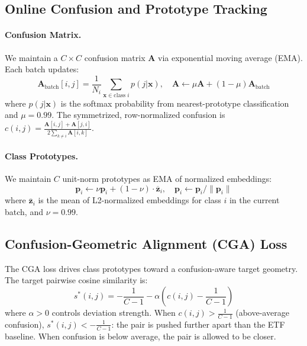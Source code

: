 \documentclass{article}
\begin{document}
\subsection{Online Confusion and Prototype Tracking}

\paragraph{Confusion Matrix.} We maintain a $C \times C$ confusion matrix $\mathbf{A}$ via exponential moving average (EMA). Each batch updates:
\begin{equation}
\mathbf{A}_{\text{batch}}[i,j] = \frac{1}{N_i} \sum_{\mathbf{x} \in \text{class } i} p(j|\mathbf{x}), \quad
\mathbf{A} \leftarrow \mu \mathbf{A} + (1-\mu) \mathbf{A}_{\text{batch}}
\end{equation}
where $p(j|\mathbf{x})$ is the softmax probability from nearest-prototype classification and $\mu = 0.99$. The symmetrized, row-normalized confusion is $c(i,j) = \frac{\mathbf{A}[i,j] + \mathbf{A}[j,i]}{2 \sum_{k \neq i} \mathbf{A}[i,k]}$.

\paragraph{Class Prototypes.} We maintain $C$ unit-norm prototypes as EMA of normalized embeddings:
\begin{equation}
\mathbf{p}_i \leftarrow \nu \mathbf{p}_i + (1-\nu) \cdot \overline{\mathbf{z}}_i, \quad \mathbf{p}_i \leftarrow \mathbf{p}_i / \|\mathbf{p}_i\|
\end{equation}
where $\overline{\mathbf{z}}_i$ is the mean of L2-normalized embeddings for class $i$ in the current batch, and $\nu = 0.99$.

\subsection{Confusion-Geometric Alignment (CGA) Loss}

The CGA loss drives class prototypes toward a confusion-aware target geometry. The target pairwise cosine similarity is:
\begin{equation}
s^*(i,j) = -\frac{1}{C-1} - \alpha \left(c(i,j) - \frac{1}{C-1}\right)
\label{eq:target}
\end{equation}
where $\alpha > 0$ controls deviation strength. When $c(i,j) > \frac{1}{C-1}$ (above-average confusion), $s^*(i,j) < -\frac{1}{C-1}$: the pair is pushed further apart than the ETF baseline. When confusion is below average, the pair is allowed to be closer.
\end{document}
